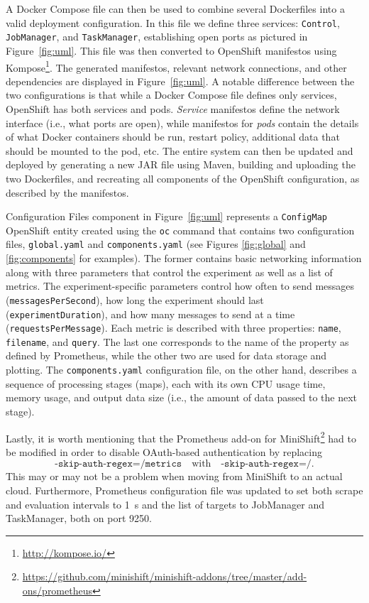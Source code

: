 \documentclass{article}
\begin{document}
A Docker Compose file can then be used to combine several Dockerfiles into a
valid deployment configuration. In this file we define three services:
\texttt{Control}, \texttt{JobManager}, and \texttt{TaskManager}, establishing
open ports as pictured in Figure~\ref{fig:uml}. This file was then converted to
OpenShift manifestos using Kompose\footnote{\url{http://kompose.io/}}. The
generated manifestos, relevant network connections, and other dependencies are
displayed in Figure~\ref{fig:uml}. A notable difference between the two
configurations is that while a Docker Compose file defines only services,
OpenShift has both services and pods. \emph{Service} manifestos define the
network interface (i.e., what ports are open), while manifestos for \emph{pods}
contain the details of what Docker containers should be run, restart policy,
additional data that should be mounted to the pod, etc. The entire system can
then be updated and deployed by generating a new JAR file using Maven, building
and uploading the two Dockerfiles, and recreating all components of the
OpenShift configuration, as described by the manifestos.

Configuration Files component in Figure~\ref{fig:uml} represents a
\texttt{ConfigMap} OpenShift entity created using the \texttt{oc} command that
contains two configuration files, \texttt{global.yaml} and
\texttt{components.yaml} (see Figures \ref{fig:global} and \ref{fig:components}
for examples). The former contains basic networking information along with three
parameters that control the experiment as well as a list of metrics.
The experiment-specific parameters control how often to send messages
(\texttt{messagesPerSecond}), how long the experiment should last
(\texttt{experimentDuration}), and how many messages to send at a time
(\texttt{requestsPerMessage}). Each metric is described with three properties:
\texttt{name}, \texttt{filename}, and \texttt{query}. The last one corresponds
to the name of the property as defined by Prometheus, while the other two are
used for data storage and plotting. The \texttt{components.yaml} configuration
file, on the other hand, describes a sequence of processing stages (maps), each
with its own CPU usage time, memory usage, and output data size (i.e., the
amount of data passed to the next stage).

Lastly, it is worth mentioning that the Prometheus add-on for
MiniShift\footnote{\url{https://github.com/minishift/minishift-addons/tree/master/add-ons/prometheus}}
had to be modified in order to disable OAuth-based authentication by replacing
\[
  \texttt{-skip-auth-regex=\^{}/metrics} \quad \text{with} \quad
  \texttt{-skip-auth-regex=\^{}/}.
\]
This may or may not be a problem when moving from MiniShift to an actual cloud.
Furthermore, Prometheus configuration file was updated to set both scrape and
evaluation intervals to \SI{1}{\second} and the list of targets to JobManager
and TaskManager, both on port 9250.
\end{document}
